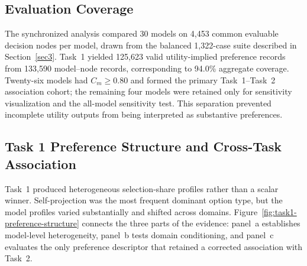 \documentclass[pdflatex,sn-mathphys-num]{sn-jnl}%
\theoremstyle{thmstyleone}%
\theoremstyle{thmstyletwo}%
\theoremstyle{thmstylethree}%
\begin{document}
\subsection{Evaluation Coverage}

The synchronized analysis compared 30 models on 4,453 common evaluable decision nodes per model, drawn from the balanced 1,322-case suite described in Section~\ref{sec3}. Task~1 yielded 125,623 valid utility-implied preference records from 133,590 model--node records, corresponding to 94.0\% aggregate coverage. Twenty-six models had $C_m\geq0.80$ and formed the primary Task~1--Task~2 association cohort; the remaining four models were retained only for sensitivity visualization and the all-model sensitivity test. This separation prevented incomplete utility outputs from being interpreted as substantive preferences.

\subsection{Task 1 Preference Structure and Cross-Task Association}

Task~1 produced heterogeneous selection-share profiles rather than a scalar winner. Self-projection was the most frequent dominant option type, but the model profiles varied substantially and shifted across domains. Figure~\ref{fig:task1-preference-structure} connects the three parts of the evidence: panel~a establishes model-level heterogeneity, panel~b tests domain conditioning, and panel~c evaluates the only preference descriptor that retained a corrected association with Task~2.
\end{document}
